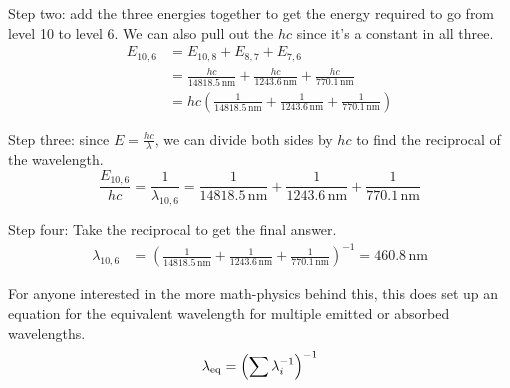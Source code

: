 \documentclass[10pt]{article}
\begin{document}
            Step two: add the three energies together to get the energy required to go from level 10 to level 6.
            We can also pull out the $hc$ since it's a constant in all three.
            \begin{align}
                E_{10,6}    &=  E_{10,8} + E_{8,7} + E_{7,6}\\
                    &=  \frac{hc}{14818.5\,\unit{\nano\meter}} + \frac{hc}{1243.6\,\unit{\nano\meter}} + \frac{hc}{770.1\,\unit{\nano\meter}}\\
                    &=  hc\left( \frac{1}{14818.5\,\unit{\nano\meter}} + \frac{1}{1243.6\,\unit{\nano\meter}} + \frac{1}{770.1\,\unit{\nano\meter}} \right)
            \end{align}

            Step three: since $E = \frac{hc}{\lambda}$, we can divide both sides by $hc$ to find the reciprocal of the wavelength.
            \begin{equation}
                \frac{E_{10,6}}{hc} =   \frac{1}{\lambda_{10,6}}
                    =   \frac{1}{14818.5\,\unit{\nano\meter}} + \frac{1}{1243.6\,\unit{\nano\meter}} + \frac{1}{770.1\,\unit{\nano\meter}}
            \end{equation}

            Step four: Take the reciprocal to get the final answer.
            \begin{align}
                \lambda_{10,6}  &=  \left( \frac{1}{14818.5\,\unit{\nano\meter}} + \frac{1}{1243.6\,\unit{\nano\meter}} + \frac{1}{770.1\,\unit{\nano\meter}} \right)^{-1}
                    =   \boxed{460.8\,\unit{\nano\meter}}
            \end{align}

            For anyone interested in the more math-physics behind this, this does set up an equation for the equivalent wavelength for multiple emitted or absorbed wavelengths.
            \begin{equation}
                \lambda_{\rm eq}    =   \left( \sum \lambda_i^{-1} \right)^{-1}
            \end{equation}
    \pagebreak
    \tableofcontents
\end{document}
